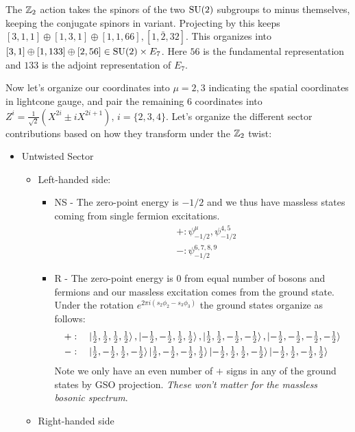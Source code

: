 \documentclass[11pt, class=article, crop=false]{standalone}
\begin{document}
\begin{enumerate}
	The $\mathbb{Z}_2$ action takes the spinors of the two $\mathrm{SU}(2)$ subgroups to minus themselves, keeping the conjugate spinors in variant. Projecting by this keeps $[3,1,1] \oplus [1,3,1] \oplus [1,1,66], [1,\bar 2, 32]$. This organizes into $[3,1] \oplus [1,133] \oplus [2,56] \in \mathrm{SU}(2) \times E_7$. Here $56$ is the fundamental representation and $133$ is the adjoint representation of $E_7$.
	
	Now let's organize our coordinates into $\mu = 2,3$ indicating the spatial coordinates in lightcone gauge, and pair the remaining $6$ coordinates into $Z^i = \frac1{\sqrt 2} (X^{2i} \pm i X^{2i+1} ), \, i = \{2,3,4\}$. Let's organize the different sector contributions based on how they transform under the $\mathbb{Z}_2$ twist:
	\begin{itemize}
		\item Untwisted Sector
			\begin{itemize}
				\item Left-handed side: 
				\begin{itemize}
					\item NS - The zero-point energy is $-1/2$ and we thus have massless states coming from single fermion excitations. 
					\[
					\begin{aligned}
						&+: \psi_{-1/2}^\mu, \psi_{-1/2}^{4,5} \\
						&-: \psi_{-1/2}^{6,7,8,9}
					\end{aligned}
					\]
					\item R - The zero-point energy is $0$ from equal number of bosons and fermions and our massless excitation comes from the ground state. Under the rotation $e^{2\pi i (s_2 \phi_2 - s_3 \phi_3)}$ the ground states organize as follows:
					\[
					\begin{aligned}
						&+: \quad \ket{\tfrac12, \tfrac12, \tfrac12, \tfrac12}, 
						\ket{-\tfrac12, -\tfrac12, \tfrac12, \tfrac12}, 
						\ket{\tfrac12, \tfrac12, -\tfrac12, -\tfrac12}, 
						\ket{-\tfrac12, -\tfrac12, -\tfrac12, -\tfrac12}  \\
						&-: \quad \ket{\tfrac12, -\tfrac12, \tfrac12, -\tfrac12}
						\ket{\tfrac12, -\tfrac12, -\tfrac12, \tfrac12}
						\ket{-\tfrac12, \tfrac12, \tfrac12, -\tfrac12}
						\ket{-\tfrac12, \tfrac12, -\tfrac12, \tfrac12} \\
					\end{aligned}
					\]
					Note we only have an even number of $+$ signs in any of the ground states by GSO projection. \emph{These won't matter for the massless bosonic spectrum}.
				\end{itemize}
				\item Right-handed side


\end{itemize}
\end{itemize}
\end{enumerate}
\end{document}
